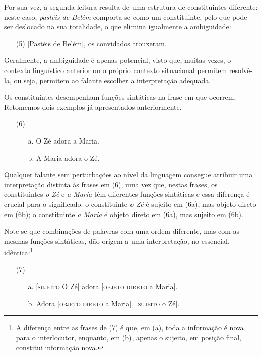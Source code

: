 \documentclass[output=paper,colorlinks,citecolor=brown,booklanguage=portuguese]{langscibook}
\begin{document}
Por sua vez, a segunda leitura resulta de uma estrutura de constituintes diferente: neste caso, \emph{pastéis de Belém} comporta-se como um constituinte, pelo que pode ser deslocado na sua totalidade, o que elimina igualmente a ambiguidade:

\begin{enumerate}[align=left]
    \item [(5)] [Pastéis de Belém], os convidados trouxeram.
\end{enumerate}

Geralmente, a ambiguidade é apenas potencial, visto que, muitas vezes, o contexto linguístico anterior ou o próprio contexto situacional permitem resolvê-la, ou seja, permitem ao falante escolher a interpretação adequada.

Os constituintes desempenham funções sintáticas na frase em que ocorrem. Retomemos dois exemplos já apresentados anteriormente. 

\begin{enumerate}[align=left]
    \item [(6)]
    \begin{enumerate}
        \item [a.] O Zé adora a Maria.
    \item	[b.] A Maria adora o Zé.
    \end{enumerate}
\end{enumerate}

Qualquer falante sem perturbações ao nível da linguagem consegue atribuir uma interpretação distinta às frases em (6), uma vez que, nestas frases, os constituintes \emph{o Zé} e \emph{a Maria} têm diferentes funções sintáticas e essa diferença é crucial para o significado: o constituinte \emph{o Zé} é sujeito em (6a), mas objeto direto em (6b); o constituinte \emph{a Maria} é objeto direto em (6a), mas sujeito em (6b). 

Note-se que combinações de palavras com uma ordem diferente, mas com as mesmas funções sintáticas, dão origem a uma interpretação, no essencial, idêntica:\footnote{A diferença entre as frases de (7) é que, em (a), toda a informação é nova para o interlocutor, enquanto, em (b), apenas o sujeito, em posição final, constitui informação nova.}

\begin{enumerate}[align=left]
    \item [(7)]
    \begin{enumerate}
        \item [a.] [\textsc{sujeito} O Zé] adora [\textsc{objeto direto} a Maria].
      	\item [b.] Adora [\textsc{objeto direto} a Maria], [\textsc{sujeito} o Zé].
    \end{enumerate}
\end{enumerate}
\end{document}
